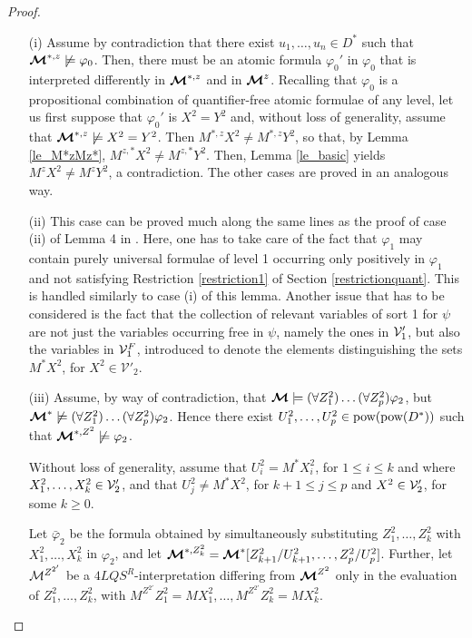 \documentclass{fundam}
\newcommand{\model}{\ensuremath{\mbox{\boldmath $\mathcal{M}$}}\xspace}
\newcommand{\pow}{\mbox{\rm pow}}
\newcommand{\QLQSR}{\ensuremath{\mbox{$4\mathit{LQS}^{R}$}}\xspace}
\begin{document}
\begin{proof}
\begin{itemize}
\item [(i)]
Assume by contradiction that there exist $u_1,\ldots,u_n \in D^*$
such that $\model^{*,z}\not\models \varphi_0$.
Then, there must be an atomic formula $\varphi_0'$ in $\varphi_0$ that
is interpreted differently in $\model^{*,z}$ and in $\model^z$.
Recalling that $\varphi_0$ is a propositional combination of
quantifier-free atomic formulae of any level, let us first suppose
that $\varphi_0'$ is $X^2 = Y^2$ and, without loss of generality,
assume that $\model^{*,z}\not \models X^2 = Y^2$.  Then $M^{*,z}X^2
\neq M^{*,z}Y^2$, so that, by Lemma \ref{le_M*zMz*}, $M^{z,*}X^2 \neq
M^{z,*}Y^2$.  Then, Lemma \ref{le_basic} yields $M^zX^2 \neq M^zY^2$,
a contradiction.  The other cases are proved in an analogous way.

\item [(ii)] This case can be proved much along the same lines as the
proof of case (ii) of Lemma 4 in \cite{CanNic08}.  Here, one has to take
care of the fact that $\varphi_1$ may contain purely universal
formulae of level 1 occurring only positively in $\varphi_1$ and not
satisfying Restriction \ref{restriction1} of Section
\ref{restrictionquant}.  This is handled similarly to case (i)
of this lemma.  Another issue that has to be considered is the fact
that the collection of relevant variables of sort 1 for $\psi$ are not
just the variables occurring free in $\psi$, namely the ones in ${\cal
V}_1'$, but also the variables in ${\cal V}_1^{F}$, introduced to
denote the elements distinguishing the sets $M^*X^{2}$, for $X^{2} \in
\mathcal{V}'_{2}$.


\item [(iii)]
Assume, by way of contradiction, that
$\model \models(\forall
Z_1^2) \ldots (\forall Z_p^2) \varphi_2$,
but
$\model^* \not\models(\forall
Z_1^2) \ldots (\forall Z_p^2) \varphi_2$. Hence there exist $U_1^2,
\ldots, U_p^2 \in \pow(\pow(D^*))$ such that $\model^{*,Z^2}\not\models\varphi_2$.

Without loss of generality, assume that $U_i^2 = M^*X_i^2$, for $1
\leq i \leq k$ and where $X_1^2,\ldots,X_k^2 \in {\cal V}_2'$, and
that $U_j^2 \neq M^*X^2$, for $k+1 \leq j \leq p$ and
$X^2 \in {\cal V}_2'$, for some $k \geq 0$.

Let $\bar{\varphi}_2$ be the formula obtained by simultaneously
substituting $Z_1^2,\ldots,Z_k^2$ with $X_1^2,\ldots,X_k^2$ in
$\varphi_2$, and let $\model^{*,Z_k^2} =
\model^*[Z_{k+1}^2/U_{k+1}^2,\ldots,Z_{p}^2/U_p^2]$.  Further, let
${\cal M}^{Z^{2'}}$ be a $\QLQSR$-interpretation differing from
$\model^{Z^2}$ only in the evaluation of $Z_1^2,\ldots,Z_k^2$, with
$M^{Z^{2'}}Z_1^2 = MX_1^2,\ldots, M^{Z^{2'}}Z_k^2 = MX_k^2$.


\end{itemize}
\end{proof}
\end{document}
